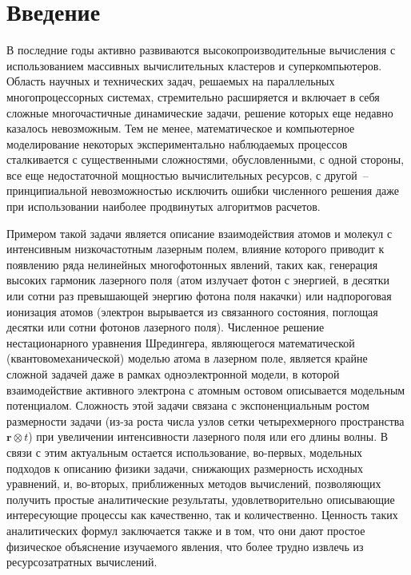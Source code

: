 \documentclass[14pt]{article}
\numberwithin{figure}{section}
\numberwithin{equation}{section}
\newcommand{\vr}{\mathbf{r}}
\begin{document}
\tableofcontents

\newpage

\section*{\centering Введение}

В последние годы активно развиваются высокопроизводительные вычисления с использованием массивных вычислительных кластеров и суперкомпьютеров. Область научных и технических задач, решаемых на параллельных многопроцессорных системах, стремительно расширяется и включает в себя сложные многочастичные динамические задачи, решение которых еще недавно казалось невозможным. Тем не менее, математическое и компьютерное моделирование некоторых экспериментально наблюдаемых процессов сталкивается с существенными сложностями, обусловленными, с одной стороны, все еще недостаточной мощностью вычислительных ресурсов, с другой~-- принципиальной невозможностью исключить ошибки численного решения даже при использовании наиболее продвинутых алгоритмов расчетов.  

Примером такой задачи является описание взаимодействия атомов и молекул с интенсивным низкочастотным лазерным полем, влияние которого приводит к появлению ряда нелинейных многофотонных явлений, таких как, генерация высоких гармоник лазерного поля (атом излучает фотон с энергией, в десятки или сотни раз превышающей энергию фотона поля накачки) или надпороговая ионизация атомов (электрон вырывается из связанного состояния, поглощая десятки или сотни фотонов лазерного поля). Численное решение нестационарного уравнения Шредингера, являющегося математической (квантовомеханической) моделью атома в лазерном поле, является крайне сложной задачей даже в рамках одноэлектронной модели, в которой взаимодействие активного электрона с атомным остовом описывается модельным потенциалом. Сложность этой задачи связана с экспоненциальным ростом размерности задачи (из-за роста числа узлов сетки четырехмерного пространства $\vr\otimes t$) при увеличении интенсивности лазерного поля или его длины волны. В связи с этим актуальным остается использование, во-первых, модельных подходов к описанию физики задачи, снижающих размерность исходных уравнений, и, во-вторых, приближенных методов вычислений, позволяющих получить простые аналитические результаты, удовлетворительно описывающие интересующие процессы как качественно, так и количественно. Ценность таких аналитических формул заключается также и в том, что они дают простое физическое объяснение изучаемого явления, что более трудно извлечь из ресурсозатратных вычислений.
\end{document}
